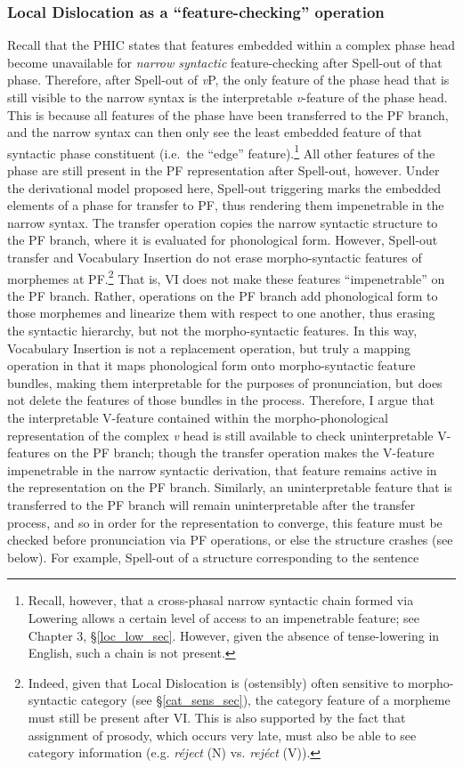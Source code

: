 \subsubsection{Local Dislocation as a ``feature-checking'' operation}
Recall that the PHIC states that features embedded within a complex phase head become unavailable for {\it narrow syntactic} feature-checking after Spell-out of that phase. Therefore, after Spell-out of {\it v}P, the only feature of the phase head that is still visible to the narrow syntax is the interpretable {\it v}-feature of the phase head. This is because all features of the phase have been transferred to the PF branch, and the narrow syntax can then only see the least embedded feature of that syntactic phase constituent (i.e.\ the ``edge'' feature).\footnote{Recall, however, that a cross-phasal narrow syntactic chain formed via Lowering allows a certain level of access to an impenetrable feature; see Chapter 3, \S\ref{loc_low_sec}. However, given the absence of tense-lowering in English, such a chain is not present.} All other features of the phase are still present in the PF representation after Spell-out, however. Under the derivational model proposed here, Spell-out triggering marks the embedded elements of a phase for transfer to PF, thus rendering them impenetrable in the narrow syntax. The transfer operation copies the narrow syntactic structure to the PF branch, where it is evaluated for phonological form. However, Spell-out transfer and Vocabulary Insertion do not erase morpho-syntactic features of morphemes at PF.\footnote{Indeed, given that Local Dislocation is (ostensibly) often sensitive to morpho-syntactic category (see \S\ref{cat_sens_sec}), the category feature of a morpheme must still be present after VI. This is also supported by the fact that assignment of prosody, which occurs very late, must also be able to see category information (e.g. {\it r\'{e}ject} (N) vs. {\it rej\'{e}ct} (V)).} That is, VI does not make these features ``impenetrable'' on the PF branch. Rather, operations on the PF branch add phonological form to those morphemes and linearize them with respect to one another, thus erasing the syntactic hierarchy, but not the morpho-syntactic features. In this way, Vocabulary Insertion is not a replacement operation, but truly a mapping operation in that it maps phonological form onto morpho-syntactic feature bundles, making them interpretable for the purposes of pronunciation, but does not delete the features of those bundles in the process. Therefore, I argue that the interpretable V-feature contained within the morpho-phonological representation of the complex {\it v} head is still available to check uninterpretable V-features on the PF branch; though the transfer operation makes the V-feature impenetrable in the narrow syntactic derivation, that feature remains active in the representation on the PF branch. Similarly, an uninterpretable feature that is transferred to the PF branch will remain uninterpretable after the transfer process, and so in order for the representation to converge, this feature must be checked before pronunciation via PF operations, or else the structure crashes (see below). For example, Spell-out of a structure corresponding to the sentence 